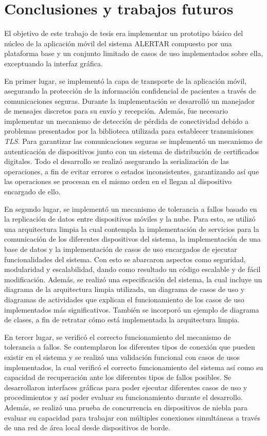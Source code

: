 \chapter{Conclusiones y trabajos futuros}
\label{cap:conclusionesYTrabajosFuturos}

El objetivo de este trabajo de tesis era implementar un prototipo básico del núcleo de la aplicación móvil del sistema ALERTAR compuesto por una plataforma base y un conjunto limitado de casos de uso implementados sobre ella, exceptuando la interfaz gráfica. 

En primer lugar, se implementó la capa de transporte de la aplicación móvil, asegurando la protección de la información confidencial de pacientes a través de comunicaciones seguras. Durante la implementación se desarrolló un manejador de mensajes discretos para su envío y recepción. Además, fue necesario implementar un mecanismo de detección de pérdida de conectividad debido a problemas presentados por la biblioteca utilizada para establecer transmisiones \textit{TLS}. Para garantizar las comunicaciones seguras se implementó un mecanismo de autenticación de dispositivos junto con un sistema de distribución de certificados digitales. Todo el desarrollo se realizó asegurando la serialización de las operaciones, a fin de evitar errores o estados inconsistentes, garantizando así que las operaciones se procesan en el mismo orden en el llegan al dispositivo encargado de ello.

En segundo lugar, se implementó un mecanismo de tolerancia a fallos basado en la replicación de datos entre dispositivos móviles y la nube. Para esto, se utilizó una arquitectura limpia la cual contempla la implementación de servicios para la comunicación de los diferentes dispositivos del sistema, la implementación de una base de datos y la implementación de casos de uso encargados de ejecutar funcionalidades del sistema. Con esto se abarcaron aspectos como seguridad, modularidad y escalabilidad, dando como resultado un código escalable y de fácil modificación. Además, se realizó una especificación del sistema, la cual incluye un diagrama de la arquitectura limpia utilizada, un diagrama de casos de uso y diagramas de actividades que explican el funcionamiento de los casos de uso implementados más significativos. También se incorporó un ejemplo de diagrama de clases, a fin de retratar cómo está implementada la arquitectura limpia.

En tercer lugar, se verificó el correcto funcionamiento del mecanismo de tolerancia a fallos. Se contemplaron los diferentes tipos de conexión que pueden existir en el sistema y se realizó una validación funcional con casos de usos implementados, la cual verificó el correcto funcionamiento del sistema así como su capacidad de recuperación ante los diferentes tipos de fallos posibles. Se desarrollaron interfaces gráficas para poder ejecutar diferentes casos de uso y procedimientos y así poder evaluar su funcionamiento durante el desarrollo. Además, se realizó una prueba de concurrencia en dispositivos de niebla para evaluar su capacidad para trabajar con múltiples conexiones simultáneas a través de una red de área local desde dispositivos de borde.

